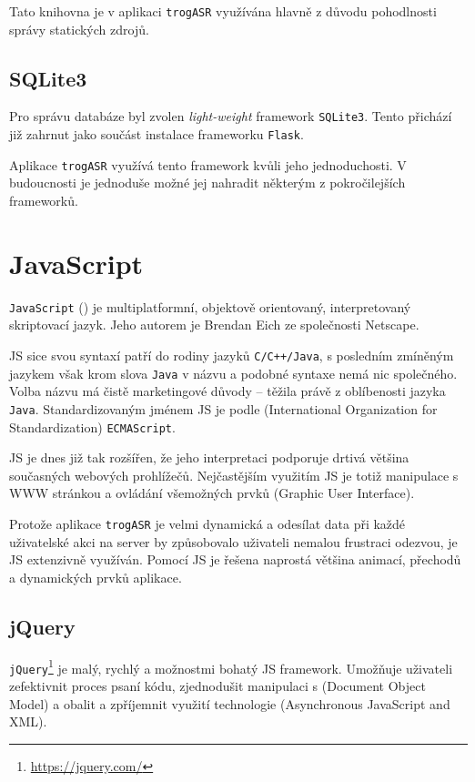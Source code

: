 Tato knihovna je v aplikaci \verb|trogASR| využívána hlavně z důvodu pohodlnosti správy statických zdrojů.

\subsection{SQLite3}

Pro správu databáze byl zvolen {\sl light-weight} framework \verb|SQLite3|. Tento přichází již zahrnut jako součást instalace frameworku \verb|Flask|.

Aplikace \verb|trogASR| využívá tento framework kvůli jeho jednoduchosti. V budoucnosti je jednoduše možné jej nahradit některým z pokročilejších frameworků.

\section{JavaScript}

\verb|JavaScript| () je multiplatformní, objektově orientovaný, interpretovaný skriptovací jazyk. Jeho autorem je Brendan Eich ze společnosti Netscape.

JS sice svou syntaxí patří do rodiny jazyků \verb|C/C++/Java|, s posledním zmíněným jazykem však krom slova \verb|Java| v názvu a podobné syntaxe nemá nic společného. Volba názvu má čistě marketingové důvody -- těžila právě z oblíbenosti jazyka \verb|Java|. Standardizovaným jménem JS je podle  (International Organization for Standardization) \verb|ECMAScript|.

JS je dnes již tak rozšířen, že jeho interpretaci podporuje drtivá většina současných webových prohlížečů. Nejčastějším využitím JS je totiž manipulace s WWW stránkou a ovládání všemožných prvků  (Graphic User Interface).

Protože aplikace \verb|trogASR| je velmi dynamická a odesílat data při každé uživatelské akci na server by způsobovalo uživateli nemalou frustraci odezvou, je JS extenzivně využíván. Pomocí JS je řešena naprostá většina animací, přechodů a dynamických prvků aplikace.

\subsection{jQuery}

\verb|jQuery|\footnote{\url{https://jquery.com/}} je malý, rychlý a možnostmi bohatý JS framework. Umožňuje uživateli zefektivnit proces psaní kódu, zjednodušit manipulaci s  (Document Object Model) a obalit a zpříjemnit využití technologie  (Asynchronous JavaScript and XML).

